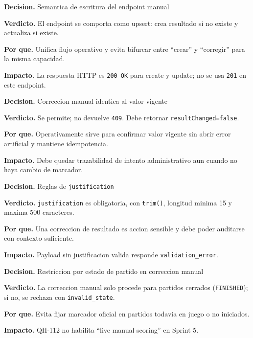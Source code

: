 \begin{docnote}
\textbf{Decision.} Semantica de escritura del endpoint manual

\textbf{Verdicto.} El endpoint se comporta como upsert: crea resultado si no existe y actualiza si existe.

\textbf{Por que.} Unifica flujo operativo y evita bifurcar entre ``crear'' y ``corregir'' para la misma capacidad.

\textbf{Impacto.} La respuesta HTTP es \texttt{200 OK} para create y update; no se usa \texttt{201} en este endpoint.
\end{docnote}

\begin{docnote}
\textbf{Decision.} Correccion manual identica al valor vigente

\textbf{Verdicto.} Se permite; no devuelve \texttt{409}. Debe retornar \texttt{resultChanged=false}.

\textbf{Por que.} Operativamente sirve para confirmar valor vigente sin abrir error artificial y mantiene idempotencia.

\textbf{Impacto.} Debe quedar trazabilidad de intento administrativo aun cuando no haya cambio de marcador.
\end{docnote}

\begin{docnote}
\textbf{Decision.} Reglas de \texttt{justification}

\textbf{Verdicto.} \texttt{justification} es obligatoria, con \texttt{trim()}, longitud minima 15 y maxima 500 caracteres.

\textbf{Por que.} Una correccion de resultado es accion sensible y debe poder auditarse con contexto suficiente.

\textbf{Impacto.} Payload sin justificacion valida responde \texttt{validation\_error}.
\end{docnote}

\begin{docnote}
\textbf{Decision.} Restriccion por estado de partido en correccion manual

\textbf{Verdicto.} La correccion manual solo procede para partidos cerrados (\texttt{FINISHED}); si no, se rechaza con \texttt{invalid\_state}.

\textbf{Por que.} Evita fijar marcador oficial en partidos todavia en juego o no iniciados.

\textbf{Impacto.} QH-112 no habilita ``live manual scoring'' en Sprint 5.
\end{docnote}

